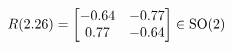 \documentclass[preview]{standalone}
\begin{document}
\begin{align*}
\special{dvisvgm:raw <g id='unique000'>}R(2.26) = \begin{bmatrix} -0.64 & -0.77 \\ 0.77 & -0.64 \end{bmatrix} \in \text{SO}(2)\special{dvisvgm:raw </g>}
\end{align*}
\end{document}
